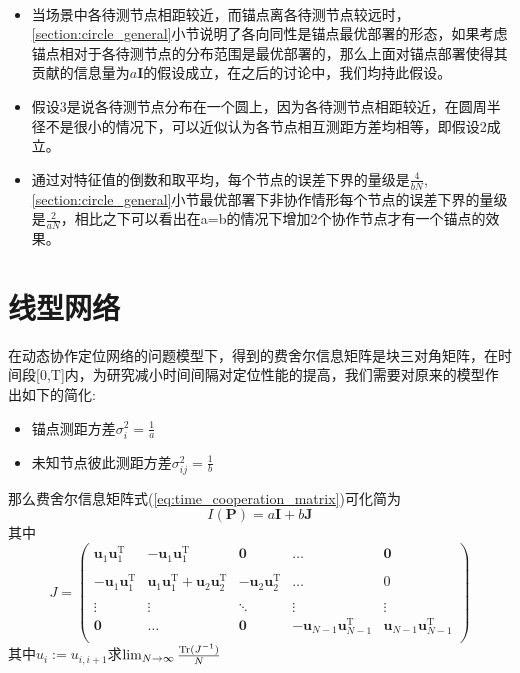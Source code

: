 \begin{remark}
~\\
\begin{itemize}
  \item 当场景中各待测节点相距较近，而锚点离各待测节点较远时，\ref{section:circle_general}小节说明了各向同性是锚点最优部署的形态，如果考虑锚点相对于各待测节点的分布范围是最优部署的，那么上面对锚点部署使得其贡献的信息量为$a\bm{I}$的假设成立，在之后的讨论中，我们均持此假设。
  \item 假设3是说各待测节点分布在一个圆上，因为各待测节点相距较近，在圆周半径不是很小的情况下，可以近似认为各节点相互测距方差均相等，即假设2成立。
  \item 通过对特征值的倒数和取平均，每个节点的误差下界的量级是$\frac{4}{bN}$,\ref{section:circle_general}小节最优部署下非协作情形每个节点的误差下界的量级是$\frac{2}{aN}$，相比之下可以看出在a=b的情况下增加2个协作节点才有一个锚点的效果。
\end{itemize}

\end{remark}
\section{线型网络}\label{section:linear_network}
在动态协作定位网络的问题模型下，得到的费舍尔信息矩阵是块三对角矩阵，在时间段[0,T]内，为研究减小时间间隔对定位性能的提高，我们需要对原来的模型作出如下的简化:
\begin{itemize}
\item 锚点测距方差$\sigma_i^2=\frac{1}{a}$
\item 未知节点彼此测距方差$\sigma^2_{ij}=\frac{1}{b}$
\end{itemize}
那么费舍尔信息矩阵式(\ref{eq:time_cooperation_matrix})可化简为
\begin{equation}\label{eq:Pab}
I(\bm{P})=a\bm{I}+b\bm{J}
\end{equation}
其中\[
J=\left(
\begin{array}{ccccc}
\bm{u}_{1}\bm{u}_{1}^{\textrm{T}} &-\bm{u}_{1}\bm{u}_{1}^{\textrm{T}} &\bm{0}&\dots&\bm{0}\\
&&&&\\
-\bm{u}_{1}\bm{u}_{1}^{\textrm{T}} &\bm{u}_{1}\bm{u}_{1}^{\textrm{T}} +\bm{u}_{2}\bm{u}_{2}^{\textrm{T}} &-\bm{u}_{2}\bm{u}_{2}^{\textrm{T}} &\dots&0\\
&&&&\\
\vdots &\vdots&\ddots &\vdots&\vdots\\
\bm{0}&\dots&\bm{0}&-\bm{u}_{N-1}\bm{u}_{N-1}^{\textrm{T}} &\bm{u}_{N-1}\bm{u}_{N-1}^{\textrm{T}} \\
\end{array}
\right)
\]
其中$u_i:=u_{i,i+1}$求$\lim_{N\to \infty}\frac{\operatorname{Tr}(J^{-1})}{N}$


